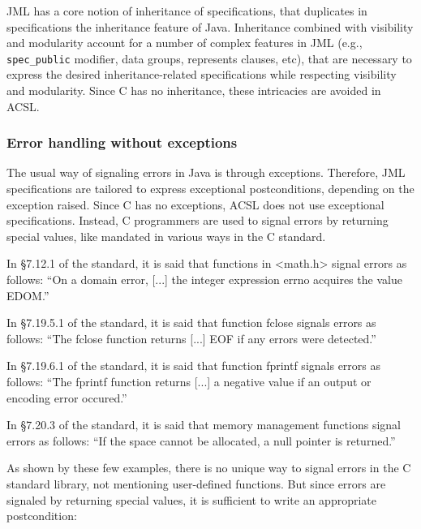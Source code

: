 JML has a core notion of inheritance of specifications, that duplicates
in specifications the inheritance feature of Java.  Inheritance
combined with visibility and modularity account for a number of
complex features in JML (e.g., \verb|spec_public| modifier, data
groups, represents clauses, etc), that are necessary to express the
desired inheritance-related specifications while respecting visibility
and modularity. Since C has no inheritance, these intricacies are
avoided in ACSL.

\subsubsection*{Error handling without exceptions}

The usual way of signaling errors in Java is through
exceptions. Therefore, JML specifications are tailored to express
exceptional postconditions, depending on the exception raised. Since C
has no exceptions, ACSL does not use exceptional
specifications. Instead, C programmers are used to signal errors by
returning special values, like mandated in various ways in the C standard.

\begin{example}
In \S 7.12.1 of the standard, it is said that functions in <math.h>
signal errors as follows:
``On a domain error, [...] the integer expression errno
acquires the value EDOM.''
\end{example}

\begin{example}
In \S 7.19.5.1 of the standard, it is said that function fclose signals
errors as follows:
``The fclose function returns [...] EOF if any errors were detected.''
\end{example}

\begin{example}
In \S 7.19.6.1 of the standard, it is said that function fprintf
signals errors as follows:
``The fprintf function returns [...] a negative value if an output or
encoding error occured.''
\end{example}

\begin{example}
In \S 7.20.3 of the standard, it is said that memory management functions
signal errors as follows:
``If the space cannot be allocated, a null pointer is returned.''
\end{example}

As shown by these few examples, there is no unique way to signal
errors in the C standard library, not mentioning user-defined
functions. But since errors are signaled by returning special values, it
is sufficient to write an appropriate postcondition:


